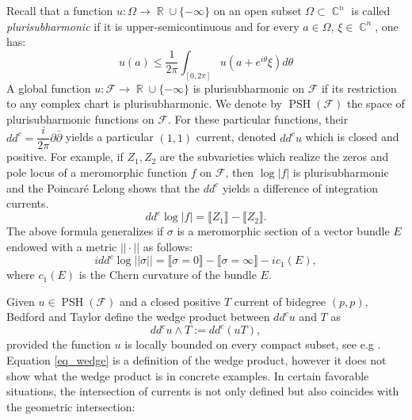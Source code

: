 \documentclass[12pt]{amsbook}%
\theoremstyle{definition}
\theoremstyle{remark}
\numberwithin{section}{chapter}
\numberwithin{subsection}{section}
\numberwithin{figure}{chapter}
\DeclareMathOperator{\C}{\mathbb{C}}
\DeclareMathOperator{\PSH}{PSH}
\DeclareMathOperator{\R}{\mathbb{R}}
\newcommand\intcur[1]{\llbracket #1 \rrbracket}
\def\cF{{\mathscr{F}}}
\begin{document}
{{Recall that a function $u \colon \Omega \to \R \cup \{ - \infty \} $ on an open subset $\Omega \subset \C^n$ is called  \textit{ plurisubharmonic} if it is upper-semicontinuous and %
for every $a \in \Omega$, $\xi \in \C^n$, one has: 
\begin{equation*}
u(a) \leqslant \dfrac{1}{2\pi} \int_{[0,2\pi]} u(a + e^{i\theta}\xi) d\theta
\end{equation*}
A global function $u\colon \cF \to \R \cup \{ -\infty\} $ is plurisubharmonic on $\cF$ if its restriction to any complex chart is plurisubharmonic. We denote by $\PSH(\cF)$ the space of plurisubharmonic functions on $\cF$. 
 For these particular functions, their  $dd^c = \dfrac{i}{2\pi} \partial \bar \partial$  yields a particular $(1,1)$ current, denoted $dd^c u$ which is closed and positive.    
  For example, if $ Z_1 , Z_2$ are the subvarieties which realize the zeros and pole locus of a meromorphic function $f$ on $\cF$, then $\log |f|$ is plurisubharmonic and the Poincar\'e Lelong shows that the $dd^c$ yields a difference of integration currents. 
  $$dd^c \log |f| = \intcur{Z_1} - \intcur{Z_2}. $$
  The above formula generalizes if $\sigma$ is a meromorphic section of a vector bundle $E$ endowed with a metric $||\cdot||$ as follows:
  \begin{equation*}
 i dd^c \log || \sigma|| = \intcur{\sigma = 0} - \intcur{\sigma = \infty} - i c_1(E),
  \end{equation*}
  where $c_1(E)$ is the Chern curvature of the bundle $E$.
\smallskip   
  
  Given $u \in \PSH(\cF)$ and a closed positive $T$ current of bidegree $(p,p)$,  Bedford and Taylor define the wedge product between $dd^c u$ and $T$ as
  \begin{equation} \label{eq_wedge} 
  dd^c u \wedge T:= dd^c(uT),
  \end{equation}
  provided the function $u$ is locally bounded on every compact subset, see e.g \cite[p. 145]{demailly}.  
  Equation \eqref{eq_wedge} is a definition of the wedge product, however it does not show what the wedge product is in concrete examples.
In certain favorable situations, the intersection of currents is not only defined but also coincides with the geometric intersection:  

}}
\end{document}
